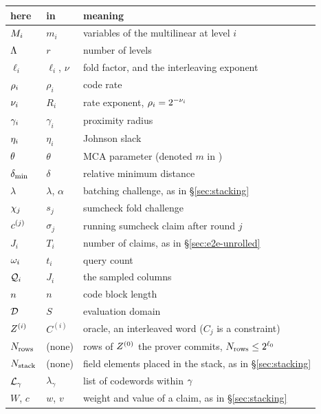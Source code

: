 \begin{center}\small
\begin{tabular}{@{}lll@{}}
\hline
here & in \cite{ACFY25,NA25,BCHKS25} & meaning\\
\hline
$M_i$        & $m_i$        & variables of the multilinear at level $i$\\
$\Lambda$        & $r$          & number of levels\\
$\ell_i$       & $\ell_i$, $\nu$ & fold factor, and the interleaving exponent\\
$\rho_i$      & $\rho_i$     & code rate\\
$\nu_i$      & $R_i$        & rate exponent, $\rho_i=2^{-\nu_i}$\\
$\gamma_i$       & $\gamma_i$   & proximity radius\\
$\eta_i$     & $\eta_i$     & Johnson slack\\
$\theta$      & $\theta$     & MCA parameter (denoted $m$ in \cite{BCHKS25})\\
$\delta_{\min}$        & $\delta$     & relative minimum distance\\
$\lambda$      & $\lambda$, $\alpha$ & batching challenge, as in \S\ref{sec:stacking}\\
$\chi_j$        & $s_j$        & sumcheck fold challenge\\
$c^{(j)}$       & $\sigma_j$   & running sumcheck claim after round $j$\\
$J_i$          & $T_i$        & number of claims, as in \S\ref{sec:e2e-unrolled}\\
$\omega_i$        & $t_i$        & query count\\
$\mathcal{Q}_i$      & $J_i$        & the sampled columns\\
$n$        & $n$          & code block length\\
$\mathcal{D}$         & $S$          & evaluation domain\\
$Z^{(i)}$   & $C^{(i)}$    & oracle, an interleaved word ($C_j$ is a constraint)\\
$N_{\mathrm{rows}}$       & (none)       & rows of $Z^{(0)}$ the prover commits, $N_{\mathrm{rows}} \le 2^{\ell_0}$\\
$N_{\mathrm{stack}}$      & (none)       & field elements placed in the stack, as in \S\ref{sec:stacking}\\
$\mathcal{L}_{\gamma}$  & $\lambda_\gamma$ & list of codewords within $\gamma$\\
$W$, $c$       & $w$, $v$     & weight and value of a claim, as in \S\ref{sec:stacking}\\

\end{tabular}
\end{center}
